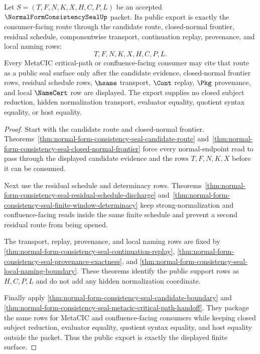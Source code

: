 \begin{theorem}
\label{thm:normal-form-consistency-seal-public-export}
Let $S=(T,F,N,K,X,H,C,P,L)$ be an accepted $\NormalFormConsistencySealUp$ packet. Its public export is exactly the consumer-facing route through the candidate route, closed-normal frontier, residual schedule, componentwise transport, continuation replay, provenance, and local naming rows:
$$
T,F,N,K,X,H,C,P,L .
$$
Every MetaCIC critical-path or confluence-facing consumer may cite that route as a public seal surface only after the candidate evidence, closed-normal frontier rows, residual schedule rows, $\hsame$ transport, $\Cont$ replay, $\Pkg$ provenance, and local $\NameCert$ row are displayed. The export supplies no closed subject reduction, hidden normalization transport, evaluator equality, quotient syntax equality, or host equality.
\end{theorem}
\begin{proof}
Start with the candidate route and closed-normal frontier. Theorems~\ref{thm:normal-form-consistency-seal-candidate-route} and~\ref{thm:normal-form-consistency-seal-closed-normal-frontier} force every normal-endpoint read to pass through the displayed candidate evidence and the rows $T,F,N,K,X$ before it can be consumed.

Next use the residual schedule and determinacy rows. Theorems~\ref{thm:normal-form-consistency-seal-residual-schedule-discharge} and~\ref{thm:normal-form-consistency-seal-finite-window-determinacy} keep strong-normalization and confluence-facing reads inside the same finite schedule and prevent a second residual route from being opened.

The transport, replay, provenance, and local naming rows are fixed by \autoref{thm:normal-form-consistency-seal-continuation-replay}, \autoref{thm:normal-form-consistency-seal-provenance-exactness}, and \autoref{thm:normal-form-consistency-seal-local-naming-boundary}. These theorems identify the public support rows as $H,C,P,L$ and do not add any hidden normalization coordinate.

Finally apply \autoref{thm:normal-form-consistency-seal-candidate-boundary} and \autoref{thm:normal-form-consistency-seal-metacic-critical-path-handoff}. They package the same rows for MetaCIC and confluence-facing consumers while keeping closed subject reduction, evaluator equality, quotient syntax equality, and host equality outside the packet. Thus the public export is exactly the displayed finite surface.
\end{proof}

